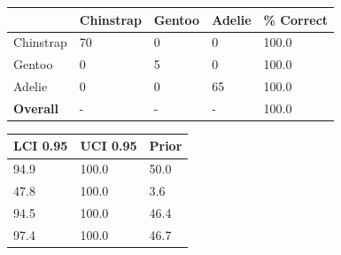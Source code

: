 \documentclass[
  letterpaper,
  DIV=11,
  numbers=noendperiod]{scrartcl}
\begin{document}
\begin{figure}

\begin{minipage}[b]{0.50\linewidth}

{\centering 

\begin{longtable}[]{@{}lllll@{}}
\toprule()
& Chinstrap & Gentoo & Adelie & \textbf{\% Correct} \\
\midrule()
\endhead
Chinstrap & 70 & 0 & 0 & 100.0 \\
Gentoo & 0 & 5 & 0 & 100.0 \\
Adelie & 0 & 0 & 65 & 100.0 \\
\textbf{Overall} & - & - & - & 100.0 \\
\bottomrule()
\end{longtable}

}

\end{minipage}%
%
\begin{minipage}[b]{0.50\linewidth}

{\centering 

\begin{longtable}[]{@{}lll@{}}
\toprule()
LCI 0.95 & UCI 0.95 & Prior \\
\midrule()
\endhead
94.9 & 100.0 & 50.0 \\
47.8 & 100.0 & 3.6 \\
94.5 & 100.0 & 46.4 \\
97.4 & 100.0 & 46.7 \\
\bottomrule()
\end{longtable}

}

\end{minipage}%
\newline
\begin{minipage}[b]{0.33\linewidth}

{\centering 

}
\end{minipage}
\end{figure}
\end{document}

